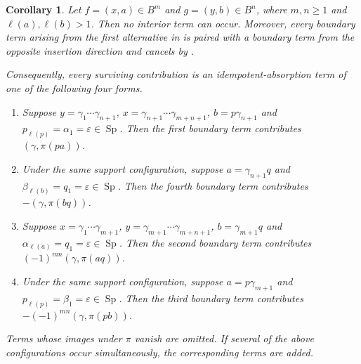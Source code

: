 \documentclass[11pt,a4paper,reqno]{amsart}
\newcommand{\Sp}{\operatorname{Sp}}
\newcommand{\para}[2]{(#1,#2)}
\theoremstyle{plain}
\newtheorem{corollary}[corollary]{Corollary}
\theoremstyle{definition}
\numberwithin{equation}{section}
\begin{document}
	\begin{corollary}
		\label{cor:higher-long-value-reduction}
		Let $f=\para{x}{a}\in B^m$ and $g=\para{y}{b}\in B^n$, where
		$m,n\geq1$ and $\ell(a),\ell(b)>1$.
		Then no interior term can occur.  Moreover, every boundary term arising
		from the first alternative in  is paired
		with a boundary term from the opposite insertion direction and cancels by
		.
		
		Consequently, every surviving contribution is an idempotent-absorption
		term of one of the following four forms.
		
		\begin{enumerate}
			\item Suppose
			$y=\gamma_1\cdots\gamma_{n+1}$,
			$x=\gamma_{n+1}\cdots\gamma_{m+n+1}$,
			$b=p\gamma_{n+1}$ and
			$p_{\ell(p)}=\alpha_1=\varepsilon\in\Sp$.
			Then the first boundary term contributes
			$\para{\gamma}{\pi(pa)}$.
			
			\item Under the same support configuration, suppose
			$a=\gamma_{n+1}q$ and
			$\beta_{\ell(b)}=q_1=\varepsilon\in\Sp$.
			Then the fourth boundary term contributes
			$-\para{\gamma}{\pi(bq)}$.
			
			\item Suppose
			$x=\gamma_1\cdots\gamma_{m+1}$,
			$y=\gamma_{m+1}\cdots\gamma_{m+n+1}$,
			$b=\gamma_{m+1}q$ and
			$\alpha_{\ell(a)}=q_1=\varepsilon\in\Sp$.
			Then the second boundary term contributes
			$(-1)^{mn}\para{\gamma}{\pi(aq)}$.
			
			\item Under the same support configuration, suppose
			$a=p\gamma_{m+1}$ and
			$p_{\ell(p)}=\beta_1=\varepsilon\in\Sp$.
			Then the third boundary term contributes
			$-(-1)^{mn}\para{\gamma}{\pi(pb)}$.
		\end{enumerate}
		
		Terms whose images under $\pi$ vanish are omitted.  If several of the
		above configurations occur simultaneously, the corresponding terms are
		added.
	\end{corollary}
	
\end{document}
